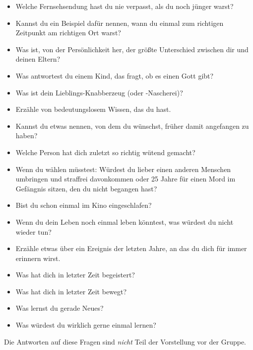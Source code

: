 \begin{itemize}
    \item Welche Fernsehsendung hast du nie verpasst, als du noch jünger warst?
    \item Kannst du ein Beispiel dafür nennen, wann du einmal zum richtigen Zeitpunkt am richtigen Ort warst?
    \item Was ist, von der Persönlichkeit her, der größte Unterschied zwischen dir und deinen Eltern?
    \item Was antwortest du einem Kind, das fragt, ob es einen Gott gibt?
    \item Was ist dein Lieblings-Knabberzeug (oder -Nascherei)?
    \item Erzähle von bedeutungslosem Wissen, das du hast.
    \item Kannst du etwas nennen, von dem du wünschst, früher damit angefangen zu haben?
    \item Welche Person hat dich zuletzt so richtig wütend gemacht?
    \item Wenn du wählen müsstest: Würdest du lieber einen anderen Menschen umbringen und straffrei davonkommen oder 25 Jahre für einen Mord im Gefängnis sitzen, den du nicht begangen hast?
    \item Bist du schon einmal im Kino eingeschlafen?
    \item Wenn du dein Leben noch einmal leben könntest, was würdest du nicht wieder tun?
    \item Erzähle etwas über ein Ereignis der letzten Jahre, an das du dich für immer erinnern wirst.
    \item Was hat dich in letzter Zeit begeistert?
    \item Was hat dich in letzter Zeit bewegt?
    \item Was lernst du gerade Neues?
    \item Was würdest du wirklich gerne einmal lernen?
\end{itemize}

Die Antworten auf diese Fragen sind \emph{nicht} Teil der Vorstellung vor der Gruppe.
